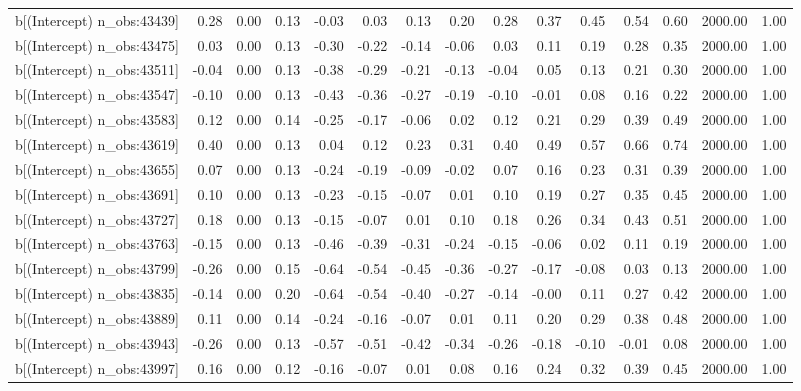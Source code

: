 \begin{table}[ht]
\begin{tabular}{rrrrrrrrrrrrrrr}
  b[(Intercept) n\_obs:43439] & 0.28 & 0.00 & 0.13 & -0.03 & 0.03 & 0.13 & 0.20 & 0.28 & 0.37 & 0.45 & 0.54 & 0.60 & 2000.00 & 1.00 \\ 
  b[(Intercept) n\_obs:43475] & 0.03 & 0.00 & 0.13 & -0.30 & -0.22 & -0.14 & -0.06 & 0.03 & 0.11 & 0.19 & 0.28 & 0.35 & 2000.00 & 1.00 \\ 
  b[(Intercept) n\_obs:43511] & -0.04 & 0.00 & 0.13 & -0.38 & -0.29 & -0.21 & -0.13 & -0.04 & 0.05 & 0.13 & 0.21 & 0.30 & 2000.00 & 1.00 \\ 
  b[(Intercept) n\_obs:43547] & -0.10 & 0.00 & 0.13 & -0.43 & -0.36 & -0.27 & -0.19 & -0.10 & -0.01 & 0.08 & 0.16 & 0.22 & 2000.00 & 1.00 \\ 
  b[(Intercept) n\_obs:43583] & 0.12 & 0.00 & 0.14 & -0.25 & -0.17 & -0.06 & 0.02 & 0.12 & 0.21 & 0.29 & 0.39 & 0.49 & 2000.00 & 1.00 \\ 
  b[(Intercept) n\_obs:43619] & 0.40 & 0.00 & 0.13 & 0.04 & 0.12 & 0.23 & 0.31 & 0.40 & 0.49 & 0.57 & 0.66 & 0.74 & 2000.00 & 1.00 \\ 
  b[(Intercept) n\_obs:43655] & 0.07 & 0.00 & 0.13 & -0.24 & -0.19 & -0.09 & -0.02 & 0.07 & 0.16 & 0.23 & 0.31 & 0.39 & 2000.00 & 1.00 \\ 
  b[(Intercept) n\_obs:43691] & 0.10 & 0.00 & 0.13 & -0.23 & -0.15 & -0.07 & 0.01 & 0.10 & 0.19 & 0.27 & 0.35 & 0.45 & 2000.00 & 1.00 \\ 
  b[(Intercept) n\_obs:43727] & 0.18 & 0.00 & 0.13 & -0.15 & -0.07 & 0.01 & 0.10 & 0.18 & 0.26 & 0.34 & 0.43 & 0.51 & 2000.00 & 1.00 \\ 
  b[(Intercept) n\_obs:43763] & -0.15 & 0.00 & 0.13 & -0.46 & -0.39 & -0.31 & -0.24 & -0.15 & -0.06 & 0.02 & 0.11 & 0.19 & 2000.00 & 1.00 \\ 
  b[(Intercept) n\_obs:43799] & -0.26 & 0.00 & 0.15 & -0.64 & -0.54 & -0.45 & -0.36 & -0.27 & -0.17 & -0.08 & 0.03 & 0.13 & 2000.00 & 1.00 \\ 
  b[(Intercept) n\_obs:43835] & -0.14 & 0.00 & 0.20 & -0.64 & -0.54 & -0.40 & -0.27 & -0.14 & -0.00 & 0.11 & 0.27 & 0.42 & 2000.00 & 1.00 \\ 
  b[(Intercept) n\_obs:43889] & 0.11 & 0.00 & 0.14 & -0.24 & -0.16 & -0.07 & 0.01 & 0.11 & 0.20 & 0.29 & 0.38 & 0.48 & 2000.00 & 1.00 \\ 
  b[(Intercept) n\_obs:43943] & -0.26 & 0.00 & 0.13 & -0.57 & -0.51 & -0.42 & -0.34 & -0.26 & -0.18 & -0.10 & -0.01 & 0.08 & 2000.00 & 1.00 \\ 
  b[(Intercept) n\_obs:43997] & 0.16 & 0.00 & 0.12 & -0.16 & -0.07 & 0.01 & 0.08 & 0.16 & 0.24 & 0.32 & 0.39 & 0.45 & 2000.00 & 1.00 \\ 

\end{tabular}
\end{table}
